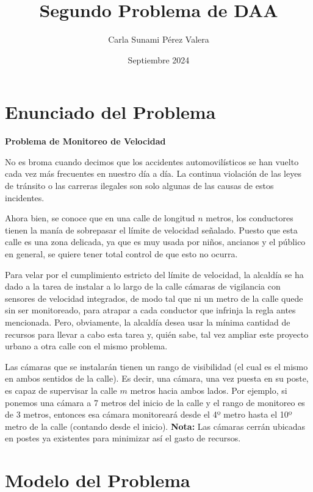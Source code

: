 \documentclass{article}
\title{Segundo Problema de DAA}
\author{Carla Sunami Pérez Valera}
\date{Septiembre 2024}
\begin{document}
\maketitle

\section{Enunciado del Problema}

\begin{center}
    
    \LARGE \textbf{Problema de Monitoreo de Velocidad} \\[0.5em] 
    
\end{center}


No es broma cuando decimos que los accidentes automovilísticos se han vuelto cada vez más frecuentes en nuestro día a día. La continua violación de las leyes de tránsito o las carreras ilegales son solo algunas de las causas de estos incidentes. 

Ahora bien, se conoce que en una calle de longitud $n$ metros, los conductores tienen la manía de sobrepasar el límite de velocidad señalado. Puesto que esta calle es una zona delicada, ya que es muy usada por niños, ancianos y el público en general, se quiere tener total control de que esto no ocurra. 

Para velar por el cumplimiento estricto del límite de velocidad, la alcaldía se ha dado a la tarea de instalar a lo largo de la calle cámaras de vigilancia con sensores de velocidad integrados, de modo tal que ni un metro de la calle quede sin ser monitoreado, para atrapar a cada conductor que infrinja la regla antes mencionada. Pero, obviamente, la alcaldía desea usar la mínima cantidad de recursos para llevar a cabo esta tarea y, quién sabe, tal vez ampliar este proyecto urbano a otra calle con el mismo problema.

Las cámaras que se instalarán tienen un rango de visibilidad (el cual es el mismo en ambos sentidos de la calle). Es decir, una cámara, una vez puesta en su poste, es capaz de supervisar la calle $m$ metros hacia ambos lados. Por ejemplo, si ponemos una cámara a 7 metros del inicio de la calle y el rango de monitoreo es de 3 metros, entonces esa cámara monitoreará desde el 4º metro hasta el 10º metro de la calle (contando desde el inicio).
\textbf{Nota:} Las cámaras cerrán ubicadas en postes ya existentes para minimizar así el gasto de recursos.

\section{Modelo del Problema}
\end{document}
